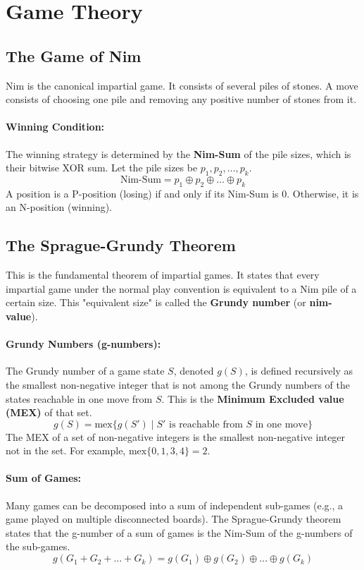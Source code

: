\section{Game Theory}

\subsection*{The Game of Nim}
Nim is the canonical impartial game. It consists of several piles of stones. A move consists of choosing one pile and removing any positive number of stones from it.
\paragraph{Winning Condition:} The winning strategy is determined by the \textbf{Nim-Sum} of the pile sizes, which is their bitwise XOR sum. Let the pile sizes be $p_1, p_2, \dots, p_k$.
$$ \text{Nim-Sum} = p_1 \oplus p_2 \oplus \dots \oplus p_k $$
A position is a P-position (losing) if and only if its Nim-Sum is 0. Otherwise, it is an N-position (winning).

\subsection*{The Sprague-Grundy Theorem}
This is the fundamental theorem of impartial games. It states that every impartial game under the normal play convention is equivalent to a Nim pile of a certain size. This "equivalent size" is called the \textbf{Grundy number} (or \textbf{nim-value}).

\paragraph{Grundy Numbers (g-numbers):}
The Grundy number of a game state $S$, denoted $g(S)$, is defined recursively as the smallest non-negative integer that is not among the Grundy numbers of the states reachable in one move from $S$. This is the \textbf{Minimum Excluded value (MEX)} of that set.
$$ g(S) = \text{mex} \{ g(S') \mid S' \text{ is reachable from } S \text{ in one move} \} $$
The MEX of a set of non-negative integers is the smallest non-negative integer not in the set. For example, $\text{mex}\{0, 1, 3, 4\} = 2$.

\paragraph{Sum of Games:}
Many games can be decomposed into a sum of independent sub-games (e.g., a game played on multiple disconnected boards). The Sprague-Grundy theorem states that the g-number of a sum of games is the Nim-Sum of the g-numbers of the sub-games.
$$ g(G_1 + G_2 + \dots + G_k) = g(G_1) \oplus g(G_2) \oplus \dots \oplus g(G_k) $$

